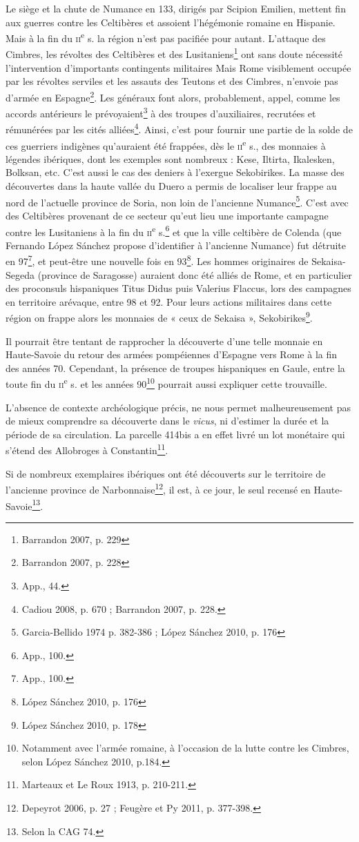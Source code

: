 \documentclass{article}
\begin{document}
Le siège et la chute de Numance en 133, dirigés par Scipion Emilien, mettent fin aux guerres contre 
les Celtibères et assoient l’hégémonie romaine en Hispanie. Mais à la 
fin du \textsc{ii}\textsuperscript{e} s. la région n’est pas pacifiée pour autant.
L’attaque des Cimbres, les révoltes des Celtibères et des Lusitaniens\footnote{Barrandon 2007, p. 229} ont
sans doute nécessité l’intervention d’importants contingents militaires	
Mais Rome visiblement occupée par les révoltes serviles et les assauts des Teutons
et des Cimbres, n’envoie pas d’armée en Espagne\footnote{Barrandon 2007, p. 228}.
Les généraux font alors, probablement, appel, comme les accords antérieurs le prévoyaient\footnote{App., 44.}
à des troupes d’auxiliaires, recrutées et rémunérées par les cités alliées\footnote{Cadiou 2008, p. 670 ; Barrandon 2007, p. 228.
}.
Ainsi, c’est pour fournir une partie de la solde de ces guerriers indigènes qu’auraient été
frappées, dès le \textsc{ii}\textsuperscript{e} s., des monnaies à légendes ibériques, dont les exemples
sont nombreux : Kese, Iltirta, Ikalesken, Bolksan, etc. C’est aussi le cas des
deniers à l’exergue Sekobirikes. La masse des découvertes dans la haute
vallée du Duero a permis de localiser leur frappe au nord de l’actuelle province
de Soria, non loin de l’ancienne Numance\footnote{Garcia-Bellido 1974 p. 382-386 ; López Sánchez 2010, p. 176}.
C’est avec des Celtibères provenant
de ce secteur qu’eut lieu une importante campagne contre les Lusitaniens à
la fin du \textsc{ii}\textsuperscript{e} s.\footnote{App., 100.} et que la ville celtibère de Colenda (que Fernando López
Sánchez propose d’identifier à l’ancienne Numance) fut détruite en 97\footnote{App., 100.}, et
peut-être une nouvelle fois en 93\footnote{López Sánchez 2010, p. 176}.
Les hommes originaires de Sekaisa-Segeda (province de Saragosse) auraient donc été alliés de Rome, et en
particulier des proconsuls hispaniques Titus Didus puis Valerius Flaccus, lors
des campagnes en territoire arévaque, entre 98 et 92. Pour leurs actions
militaires dans cette région on frappe alors les monnaies de « ceux de Sekaisa »,
Sekobirikes\footnote{López Sánchez 2010, p. 178}.

Il pourrait être tentant de rapprocher la découverte d’une telle monnaie en
Haute-Savoie du retour des armées pompéiennes d’Espagne vers Rome à la
fin des années 70. Cependant, la présence de troupes hispaniques en Gaule,
entre la toute fin du \textsc{ii}\textsuperscript{e} s. et les années 90\footnote{Notamment avec l’armée romaine, à l’occasion de la lutte contre les Cimbres, selon López Sánchez 2010,
p.184.} pourrait aussi expliquer cette
trouvaille.

L’absence de contexte archéologique précis, ne nous permet malheureusement
pas de mieux comprendre sa découverte dans le \emph{vicus}, ni d’estimer la durée
et la période de sa circulation. La parcelle 414bis a en effet livré un lot
monétaire qui s’étend des Allobroges à Constantin\footnote{Marteaux et Le Roux 1913, p. 210-211.}.

Si de nombreux exemplaires ibériques ont été découverts sur le territoire
de l’ancienne province de Narbonnaise\footnote{Depeyrot 2006, p. 27 ; Feugère et Py 2011, p. 377-398.}, il est, à ce jour, le seul recensé en
Haute-Savoie\footnote{Selon la CAG 74.}.
\end{document}
